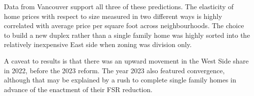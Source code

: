 \documentclass[12pt]{article}
\begin{document}
Data from Vancouver support all three of these predictions. The elasticity of home prices with respect to size measured in two different ways is highly correlated with average price per square foot across neighbourhoods. The choice to build a new duplex rather than a single family home was highly sorted into the relatively inexpensive East side when zoning was division only. 

A caveat to results is that there was an upward movement in the West Side share in 2022, before the 2023 reform. The year 2023 also featured convergence, although that may be explained by a rush to complete single family homes in advance of the enactment of their FSR reduction. 
\printbibliography[heading=bibintoc]
\end{document}

